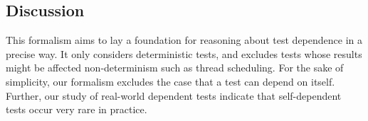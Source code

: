 \subsection{Discussion}
\label{sec:formaldiscussion}

This formalism aims to lay a foundation for reasoning about
test dependence in a precise way. It only considers
deterministic tests, and excludes tests whose results
might be affected non-determinism such as thread scheduling.
For the sake of simplicity, our formalism excludes the case that a test 
can depend on itself. Further, our study of real-world dependent
tests indicate that self-dependent tests occur very rare
in practice.








